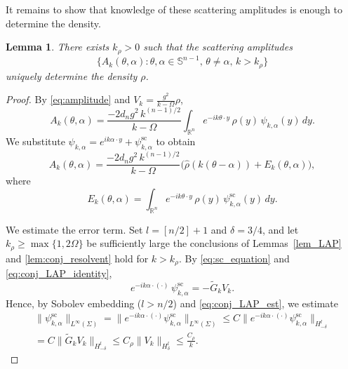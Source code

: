 \documentclass[12pt,a4paper]{amsart}
\numberwithin{equation}{section}
\theoremstyle{plain}
\newtheorem{lemma}[theorem]{Lemma}
\theoremstyle{definition}
\begin{document}
It remains to show that knowledge of these scattering amplitudes is enough to determine the density. 

\begin{lemma}\label{lem:amplitude_determines_rho}
There exists $k_\rho>0$ such that the scattering amplitudes
\begin{equation*}
    \{A_k(\theta,\alpha) : \theta,\alpha\in\mathbb{S}^{n-1},\, \theta\neq \alpha, \, k > k_\rho\}
\end{equation*}
uniquely determine the density $\rho$.
\end{lemma}

\begin{proof}
By \eqref{eq:amplitude} and $V_k = \frac{g^2}{k-\Omega}\rho$,
\begin{equation}\label{eq:Ak_expanded}
A_k(\theta,\alpha)
=
\frac{-2d_n g^2\, k^{(n-1)/2}}{k-\Omega}
\int_{\mathbb{R}^n}
e^{-ik\theta\cdot y}\,\rho(y)\,\psi_{k,\alpha}(y)\,dy.
\end{equation}
We substitute $\psi_{k,\alpha} = e^{ik\alpha\cdot y} + \psi^{\mathrm{sc}}_{k,\alpha}$
to obtain
\begin{equation}\label{eq:Ak_split}
A_k(\theta,\alpha)
=
\frac{-2d_n g^2\, k^{(n-1)/2}}{k-\Omega}
\bigl(\hat{\rho}(k(\theta - \alpha)) + E_k(\theta,\alpha)\bigr),
\end{equation}
where
\begin{equation*}
E_k(\theta,\alpha)
= \int_{\mathbb{R}^n} e^{-ik\theta\cdot y}\,\rho(y)\,
\psi^{\mathrm{sc}}_{k,\alpha}(y)\,dy.
\end{equation*}

We estimate the error term. Set $l=[n/2]+1$ and $\delta=3/4$, and let $k_\rho\geq\max\{1,2\Omega\}$ be sufficiently large the conclusions of Lemmas~\ref{lem_LAP} and \ref{lem:conj_resolvent} hold for $k>k_\rho$. By \eqref{eq:sc_equation} and \eqref{eq:conj_LAP_identity}, 
\begin{equation*}
e^{-ik\alpha\cdot (\cdot)}\,\psi^{\mathrm{sc}}_{k,\alpha} = -\widetilde{G}_k V_k.
\end{equation*} 
Hence, by Sobolev embedding ($l>n/2$) and
\eqref{eq:conj_LAP_est}, we estimate
\begin{multline*}
    \|\psi^{\mathrm{sc}}_{k,\alpha}\|_{L^\infty(\Sigma)}
    =
    \|e^{-ik\alpha\cdot(\cdot)}
    \psi^{\mathrm{sc}}_{k,\alpha}\|_{L^\infty(\Sigma)}
    \leq
    C\|e^{-ik\alpha\cdot(\cdot)}
    \psi^{\mathrm{sc}}_{k,\alpha}\|_{H^l_{-\delta}}\\
    =
    C\|\widetilde{G}_k V_k\|_{H^l_{-\delta}}
    \leq
    C_\rho \|V_k\|_{H^l_\delta}
    \leq
    \frac{C_\rho}{k}.
\end{multline*}


\end{proof}
\end{document}
